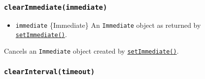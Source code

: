 \begin{Shaded}
\begin{Highlighting}[]
\NormalTok{ \{ }\OperatorTok{:}\OperatorTok{=} \NormalTok{(}\NormalTok{)}\OperatorTok{;}

\OperatorTok{=}  \NormalTok{()}\OperatorTok{;}
\OperatorTok{=}\OperatorTok{;}

\NormalTok{(}\OperatorTok{,} \OperatorTok{,}
  \NormalTok{(}\NormalTok{)}
  \KeywordTok{=\textgreater{}}\NormalTok{ \{}
     \OperatorTok{===} \NormalTok{)}
      \NormalTok{(}\NormalTok{)}\OperatorTok{;}
\NormalTok{  \})}\OperatorTok{;}

\NormalTok{()}\OperatorTok{;}
\end{Highlighting}
\end{Shaded}

\subsubsection{\texorpdfstring{\texttt{clearImmediate(immediate)}}{clearImmediate(immediate)}}\label{clearimmediateimmediate}

\begin{itemize}
\tightlist
\item
  \texttt{immediate} \{Immediate\} An \texttt{Immediate} object as
  returned by
  \hyperref[setimmediatecallback-args]{\texttt{setImmediate()}}.
\end{itemize}

Cancels an \texttt{Immediate} object created by
\hyperref[setimmediatecallback-args]{\texttt{setImmediate()}}.

\subsubsection{\texorpdfstring{\texttt{clearInterval(timeout)}}{clearInterval(timeout)}}\label{clearintervaltimeout}

